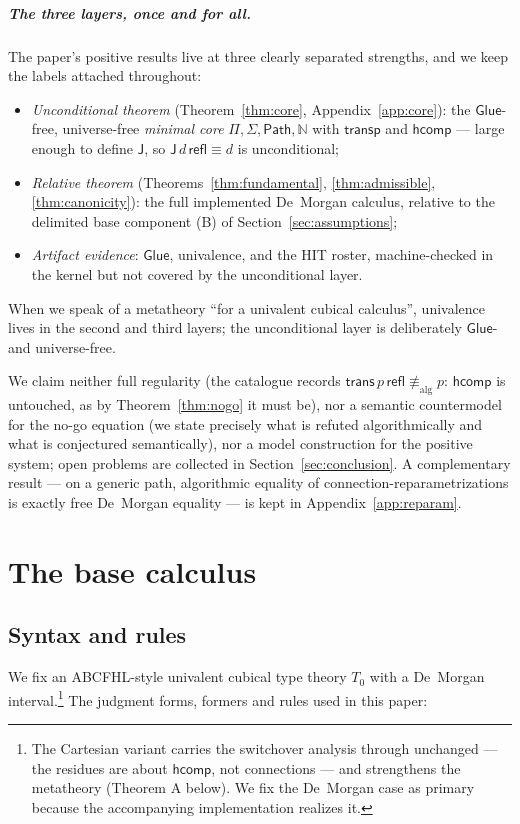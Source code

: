 \documentclass{lmcs}
\newcommand{\transp}{\mathsf{transp}}
\newcommand{\hcomp}{\mathsf{hcomp}}
\newcommand{\refl}{\mathsf{refl}}
\newcommand{\J}{\mathsf{J}}
\newcommand{\Glue}{\mathsf{Glue}}
\renewcommand{\conv}{\equiv}
\newcommand{\aconv}{\equiv_{\mathrm{alg}}}
\newcommand{\Path}{\mathsf{Path}}
\begin{document}
\subparagraph*{The three layers, once and for all.}  The paper's
positive results live at three clearly separated strengths, and we
keep the labels attached throughout:
\begin{itemize}
\item \emph{Unconditional theorem} (Theorem~\ref{thm:core},
  Appendix~\ref{app:core}): the $\Glue$-free, universe-free
  \emph{minimal core} $\Pi, \Sigma, \Path, \mathbb{N}$ with
  $\transp$ and $\hcomp$ --- large enough to define $\J$, so
  $\J\,d\,\refl \conv d$ is unconditional;
\item \emph{Relative theorem} (Theorems~\ref{thm:fundamental},
  \ref{thm:admissible}, \ref{thm:canonicity}): the full implemented
  De~Morgan calculus, relative to the delimited base component (B)
  of Section~\ref{sec:assumptions};
\item \emph{Artifact evidence}: $\Glue$, univalence, and the HIT
  roster, machine-checked in the kernel but not covered by the
  unconditional layer.
\end{itemize}
When we speak of a metatheory ``for a univalent cubical calculus'',
univalence lives in the second and third layers; the unconditional
layer is deliberately $\Glue$- and universe-free.

We claim neither full regularity (the catalogue records
$\mathsf{trans}\,p\,\refl \not\aconv p$: $\hcomp$ is untouched, as by
Theorem~\ref{thm:nogo} it must be), nor a semantic countermodel for
the no-go equation (we state precisely what is refuted
algorithmically and what is conjectured semantically), nor a model
construction for the positive system; open problems are collected in
Section~\ref{sec:conclusion}.  A complementary result --- on a
generic path, algorithmic equality of connection-reparametrizations
is exactly free De~Morgan equality --- is kept in
Appendix~\ref{app:reparam}.

\section{The base calculus}
\label{sec:base}

\subsection{Syntax and rules}
\label{sec:rules}

We fix an ABCFHL-style univalent cubical type theory $T_0$ with a
De~Morgan interval.\footnote{The Cartesian variant carries the
switchover analysis through unchanged --- the residues are about
$\hcomp$, not connections --- and strengthens the metatheory
(Theorem A below).  We fix the De~Morgan case as primary because the
accompanying implementation realizes it.}  The judgment forms,
formers and rules used in this paper:
\end{document}
